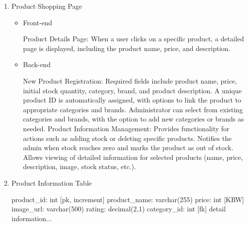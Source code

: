 \documentclass[conference]{IEEEtran}
\begin{document}
\begin{enumerate}
\setlength{\parindent}{2ex}
\item Product Shopping Page

\begin{itemize}
\setlength{\parindent}{2ex}
\item Front-end

Product Details Page: When a user clicks on a specific product, a detailed page is displayed, including the product name, price, and description.

\item Back-end

New Product Registration: Required fields include product name, price, initial stock quantity, category, brand, and product description. A unique product ID is automatically assigned, with options to link the product to appropriate categories and brands. Administrator can select from existing categories and brands, with the option to add new categories or brands as needed. \newline\hspace*{1.2ex}
Product Information Management: Provides functionality for actions such as adding stock or deleting specific products. Notifies the admin when stock reaches zero and marks the product as out of stock. Allows viewing of detailed information for selected products (name, price, description, image, stock status, etc.).
\end{itemize}

\item Product Information Table

product\_id: int [pk, increment] \newline\hspace*{1.2ex}
product\_name: varchar(255) \newline\hspace*{1.2ex}
price: int [KRW] \newline\hspace*{1.2ex}
image\_url: varchar(500) \newline\hspace*{1.2ex}
rating: decimal(2,1) \newline\hspace*{1.2ex}
category\_id: int [fk] \newline\hspace*{1.2ex}
detail information...

\hspace{0.5em}{\scriptsize Table attribute can be changed in development.}
\end{enumerate}
\end{document}
